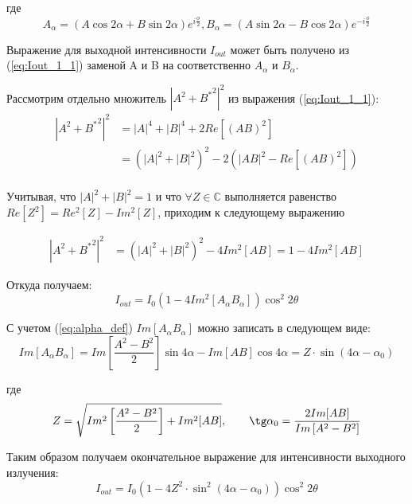 \documentclass{article}
\begin{document}
где
\begin{equation}
	\label{eq:alpha_def}
	A_\alpha = \left( A\cos2\alpha + B\sin2\alpha\right) e^{i\frac{\phi}{2}},
	B_\alpha = \left( A\sin2\alpha - B\cos2\alpha\right) e^{-i\frac{\phi}{2}}
\end{equation}

Выражение для выходной интенсивности $I_{out}$ может быть получено из (\ref{eq:Iout_1_1}) заменой A и B на соответственно $A_\alpha$ и $B_\alpha$.

Рассмотрим отдельно множитель $\left| A^2 + {B^*}^2 \right|^2$ из выражения (\ref{eq:Iout_1_1}):
\begin{equation}
	\begin{split}
		\left| A^2 + {B^*}^2 \right|^2 &= |A|^4 + |B|^4 + 2Re\left[ (A B)^2\right]\\
		&=\left( |A|^2 + |B|^2\right)^2 - 2\left(|A B|^2 - Re\left[ (A B)^2\right]\right)\\
	\end{split}
\end{equation}	

Учитывая, что $|A|^2 + |B|^2 = 1$ и что $\forall Z \in \mathbb{C}$ выполняется равенство $Re\left[ Z^2\right] = Re^2\left[ Z\right] - Im^2\left[ Z\right]
$, приходим к следующему выражению

\begin{equation}
	\begin{split}
		\left| A^2 + {B^*}^2 \right|^2 	&=\left( |A|^2 + |B|^2\right)^2 - 4Im^2[A B] = 1 - 4Im^2[A B]
	\end{split}	
\end{equation}

Откуда получаем:
\begin{equation}
	\label{eq:Iout_our_1}
	I_{out} =  I_0 \left( 1 - 4Im^2[A_\alpha B_\alpha]\right)  \cos^2 2 \theta
\end{equation}

С учетом (\ref{eq:alpha_def}) $Im[A_\alpha B_\alpha]$ можно записать в следующем виде:
\begin{equation}
		Im[A_\alpha B_\alpha]  = Im\left[ \frac{A^2-B^2}{2} \right]\sin 4 \alpha - Im[AB]\cos 4 \alpha = Z \cdot \sin(4\alpha - \alpha_0)
\end{equation}


где
\begin{equation}
	Z = \sqrt{Im^2\left[\frac{A^2-B^2}{2}\right]+Im^2[AB]}, \qquad \tg\alpha_0 = \frac{2Im[AB]}{Im\left[A^2 - B^2\right]}
\end{equation}

Таким образом получаем окончательное выражение для интенсивности выходного излучения: 
 \begin{equation}
 	I_{out} =  I_0 \left( 1 - 4 Z^2 \cdot \sin^2(4\alpha - \alpha_0)\right)  \cos^2 2 \theta
 \end{equation}
 

\printbibliography
\end{document}
